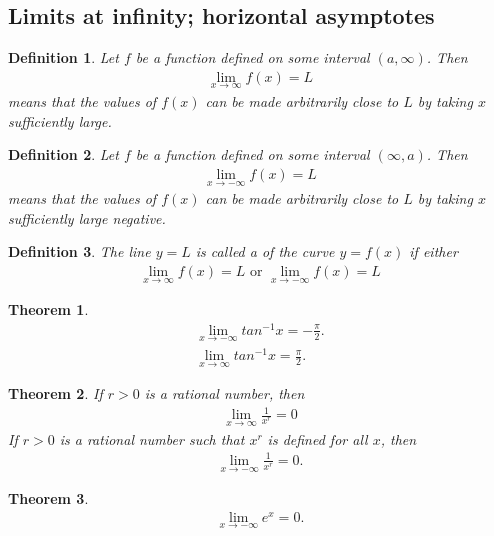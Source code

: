 \documentclass{article}
\theoremstyle{sltheorem}
\newtheorem{definition}{Definition}[section]
\newtheorem{theorem}{Theorem}[section]
\begin{document}
\subsection{Limits at infinity; horizontal asymptotes}
\begin{definition}
    Let $f$ be a function defined on some interval $(a,\infty)$. Then
    \begin{align*}
        \lim_{x\to\infty}f(x)=L
    \end{align*}
    means that the values of $f(x)$ can be made arbitrarily close to $L$ by taking $x$ sufficiently large.
\end{definition}
\begin{definition}
    Let $f$ be a function defined on some interval $(\infty, a)$. Then
    \begin{align*}
        \lim_{x\to -\infty}f(x)=L
    \end{align*}
    means that the values of $f(x)$ can be made arbitrarily close to $L$ by taking $x$ sufficiently large negative.
\end{definition}
\begin{definition}
    The line $y=L$ is called a  of the curve $y=f(x)$ if either
    \begin{align*}
        \lim_{x\to \infty}f(x)=L \text{ or } \lim_{x\to-\infty}f(x)=L
    \end{align*}
\end{definition}
\begin{theorem}
    \begin{align*}
        \lim_{x\to-\infty}tan^{-1}x=-\frac{\pi}{2}.\\
        \lim_{x\to\infty}tan^{-1}x=\frac{\pi}{2}.
    \end{align*}
\end{theorem}
\begin{theorem}
    If $r>0$ is a rational number, then
    \begin{align*}
        \lim_{x\to\infty}\frac{1}{x^r}=0
    \end{align*}
    If $r>0$ is a rational number such that $x^r$ is defined for all $x$, then
    \begin{align*}
        \lim_{x\to-\infty}\frac{1}{x^r}=0.
    \end{align*}
\end{theorem}
\begin{theorem}
    \begin{align*}
        \lim_{x\to-\infty}e^x=0.
    \end{align*}
\end{theorem}
\end{document}
